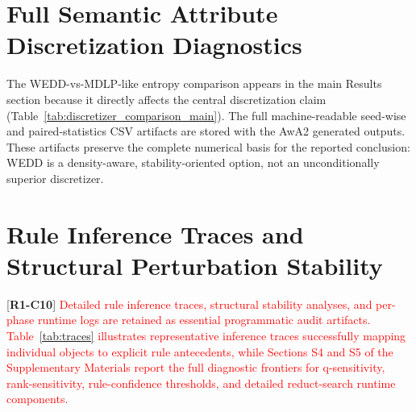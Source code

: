 \documentclass[make,article,submit,pdftex,moreauthors]{Definitions/mdpi}
\newcommand{\revtag}[2]{[\textbf{R#1-C#2}]}
\newcommand{\Rone}[1]{\textcolor{red}{#1}}
\begin{document}
\section{Full Semantic Attribute Discretization Diagnostics}
\label{sec:app_discretization}

The WEDD-vs-MDLP-like entropy comparison appears in the main Results section because it directly affects the central discretization claim (Table~\ref{tab:discretizer_comparison_main}). The full machine-readable seed-wise and paired-statistics CSV artifacts are stored with the AwA2 generated outputs. These artifacts preserve the complete numerical basis for the reported conclusion: WEDD is a density-aware, stability-oriented option, not an unconditionally superior discretizer.

\section{Rule Inference Traces and Structural Perturbation Stability}
\label{sec:app_stability}

\revtag{1}{10} \Rone{Detailed rule inference traces, structural stability analyses, and per-phase runtime logs are retained as essential programmatic audit artifacts. Table~\ref{tab:traces} illustrates representative inference traces successfully mapping individual objects to explicit rule antecedents, while Sections S4 and S5 of the Supplementary Materials report the full diagnostic frontiers for q-sensitivity, rank-sensitivity, rule-confidence thresholds, and detailed reduct-search runtime components.}
\end{document}

